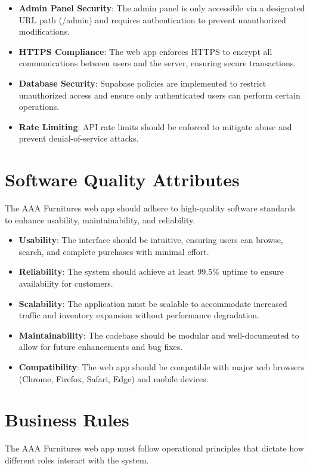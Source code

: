 \documentclass[oneside,a4paper,12pt,explicit]{book}
\begin{document}
\begin{itemize}
\item \textbf{Admin Panel Security}: The admin panel is only accessible via a designated URL path (/admin) and requires authentication to prevent unauthorized modifications.
\item \textbf{HTTPS Compliance}: The web app enforces HTTPS to encrypt all communications between users and the server, ensuring secure transactions.
\item \textbf{Database Security}: Supabase policies are implemented to restrict unauthorized access and ensure only authenticated users can perform certain operations.
\item \textbf{Rate Limiting}: API rate limits should be enforced to mitigate abuse and prevent denial-of-service attacks.
\end{itemize}

\section{Software Quality Attributes}
The AAA Furnitures web app should adhere to high-quality software standards to enhance usability, maintainability, and reliability.

\begin{itemize}
\item \textbf{Usability}: The interface should be intuitive, ensuring users can browse, search, and complete purchases with minimal effort.
\item \textbf{Reliability}: The system should achieve at least 99.5\% uptime to ensure availability for customers.
\item \textbf{Scalability}: The application must be scalable to accommodate increased traffic and inventory expansion without performance degradation.
\item \textbf{Maintainability}: The codebase should be modular and well-documented to allow for future enhancements and bug fixes.
\item \textbf{Compatibility}: The web app should be compatible with major web browsers (Chrome, Firefox, Safari, Edge) and mobile devices.
\end{itemize}

\section{Business Rules}
The AAA Furnitures web app must follow operational principles that dictate how different roles interact with the system.
\end{document}
